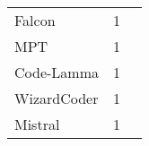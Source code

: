 \begin{table}[ht]
\begin{tabular}{l c p{4cm}}
		Falcon & 1 \\
		MPT & 1 \\
		Code-Lamma & 1 \\
		WizardCoder & 1 \\
		Mistral & 1 \\
	\bottomrule
    \end{tabular}
    \label{tab:llms}
\end{table}